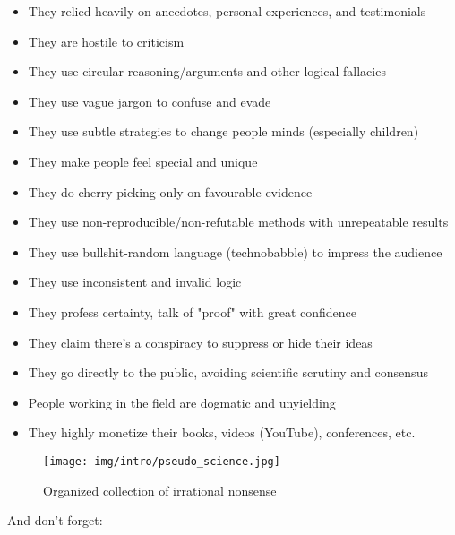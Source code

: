 \begin{itemize}
\begin{itemize}
		\item They relied heavily on anecdotes, personal experiences, and testimonials
		
		\item They are hostile to criticism

		\item They use circular reasoning/arguments and other logical fallacies

		\item They use vague jargon to confuse and evade

		\item They use subtle strategies to change people minds (especially children)
		
		\item They make people feel special and unique

		\item They do cherry picking only on favourable evidence

		\item They use non-reproducible/non-refutable methods with unrepeatable results

		\item They use bullshit-random language (technobabble) to impress the audience

		\item They use inconsistent and invalid logic
		
		\item They profess certainty, talk of "proof" with great confidence
		
		\item They claim there's a conspiracy to suppress or hide their ideas
		
		\item They go directly to the public, avoiding scientific scrutiny and consensus

		\item People working in the field are dogmatic and unyielding
		
		\item They highly monetize their books, videos (YouTube), conferences, etc.
	\end{itemize}
	\begin{figure}[H]
		\centering
		\texttt{[image: img/intro/pseudo\_science.jpg]}
		\caption{Organized collection of irrational nonsense}
	\end{figure}
	And don't forget:
	\begin{center}
	\end{center}
	

\end{itemize}
